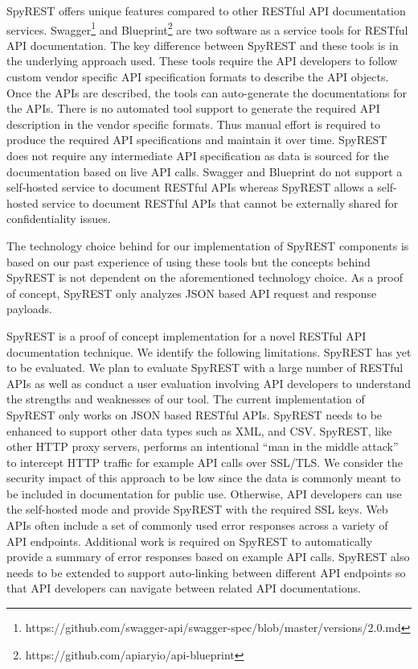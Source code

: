 SpyREST offers unique features compared to other RESTful API documentation services. Swagger\footnote{https://github.com/swagger-api/swagger-spec/blob/master/versions/2.0.md} and Blueprint\footnote{https://github.com/apiaryio/api-blueprint} are two software as a service tools for RESTful API documentation. The key difference between SpyREST and these tools is in the underlying approach used. These tools require the API developers to follow custom vendor specific API specification formats to describe the API objects. Once the APIs are described, the tools can auto-generate the documentations for the APIs. There is no automated tool support to generate the required API description in the vendor specific formats. Thus manual effort is required to produce the required API specifications and maintain it over time. SpyREST does not require any intermediate API specification as data is sourced for the documentation based on live API calls. Swagger and Blueprint do not support a self-hosted service to document RESTful APIs whereas SpyREST allows a self-hosted service to document RESTful APIs that cannot be externally shared for confidentiality issues.

The technology choice behind for our implementation of SpyREST components is based on our past experience of using these tools but the concepts behind SpyREST is not dependent on the aforementioned technology choice. As a proof of concept, SpyREST only analyzes JSON based API request and response payloads.

SpyREST is a proof of concept implementation for a novel RESTful API documentation technique. We identify the following limitations. SpyREST has yet to be evaluated. We plan to evaluate SpyREST with a large number of RESTful APIs as well as conduct a user evaluation involving API developers to understand the strengths and weaknesses of our tool. The current implementation of SpyREST only works on JSON based RESTful APIs. SpyREST needs to be enhanced to support other data types such as XML, and CSV. SpyREST, like other HTTP proxy servers, performs an intentional ``man in the middle attack'' to intercept HTTP traffic for example API calls over SSL/TLS. We consider the security impact of this approach to be low since the data is commonly meant to be included in documentation for public use. Otherwise, API developers can use the self-hosted mode and provide SpyREST with the required SSL keys. Web APIs often include a set of commonly used error responses across a variety of API endpoints. Additional work is required on SpyREST to automatically provide a summary of error responses based on example API calls. SpyREST also needs to be extended to support auto-linking between different API endpoints so that API developers can navigate between related API documentations.


